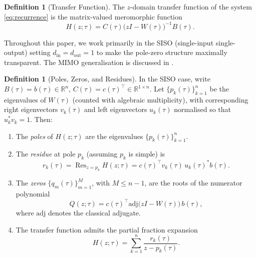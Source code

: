\documentclass[11pt,a4paper]{article}
\theoremstyle{definition}
\newtheorem{definition}[theorem]{Definition}
\DeclareMathOperator{\Res}{Res}
\newcommand{\R}{\mathbb{R}}
\begin{document}
\begin{definition}[Transfer Function]\label{def:transfer}
The $z$-domain transfer function of the system
\eqref{eq:recurrence} is the matrix-valued meromorphic function
\begin{equation}\label{eq:transfer}
  H(z;\tau) = C(\tau)\bigl(zI - W(\tau)\bigr)^{-1}B(\tau).
\end{equation}
\end{definition}

\noindent
Throughout this paper, we work primarily in the SISO
(single-input single-output) setting $d_{\mathrm{in}} = d_{\mathrm{out}} = 1$
to make the pole-zero structure maximally transparent. The MIMO
generalisation is discussed in .

\begin{definition}[Poles, Zeros, and Residues]\label{def:poles_zeros}
In the SISO case, write $B(\tau) = b(\tau) \in \R^n$,
$C(\tau) = c(\tau)^{\top} \in \R^{1 \times n}$. Let
$\{p_k(\tau)\}_{k=1}^n$ be the eigenvalues of $W(\tau)$
(counted with algebraic multiplicity), with corresponding right
eigenvectors $v_k(\tau)$ and left eigenvectors $u_k(\tau)$ normalised
so that $u_k^* v_k = 1$. Then:
\begin{enumerate}[label=(\roman*)]
  \item The \emph{poles} of $H(z;\tau)$ are the eigenvalues
    $\{p_k(\tau)\}_{k=1}^n$.
  \item The \emph{residue} at pole $p_k$ (assuming $p_k$ is simple) is
    \begin{equation}\label{eq:residue}
      r_k(\tau) = \Res_{z=p_k} H(z;\tau)
      = c(\tau)^{\top} v_k(\tau)\, u_k(\tau)^* b(\tau).
    \end{equation}
  \item The \emph{zeros} $\{q_m(\tau)\}_{m=1}^{M}$, with $M \le n-1$,
    are the roots of the numerator polynomial
    \begin{equation}\label{eq:numerator}
      Q(z;\tau) = c(\tau)^{\top} \mathrm{adj}\bigl(zI - W(\tau)\bigr)
      \, b(\tau),
    \end{equation}
    where $\mathrm{adj}$ denotes the classical adjugate.
  \item The transfer function admits the partial fraction expansion
    \begin{equation}\label{eq:partial_fraction}
      H(z;\tau) = \sum_{k=1}^{n} \frac{r_k(\tau)}{z - p_k(\tau)}.
    \end{equation}
\end{enumerate}
\end{definition}
\end{document}
